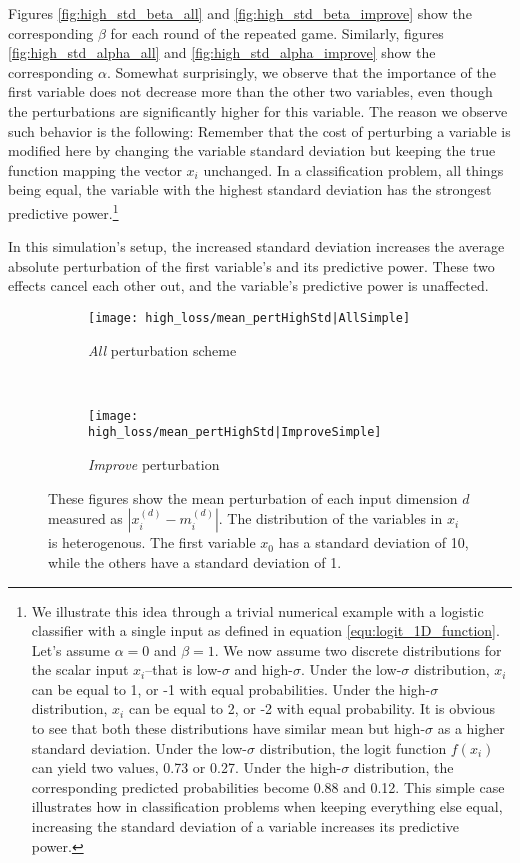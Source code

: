\documentclass[12pt]{article} %
\begin{document}
Figures \ref{fig:high_std_beta_all} and \ref{fig:high_std_beta_improve} show the corresponding $\beta$ for each round of the repeated game. Similarly, figures \ref{fig:high_std_alpha_all} and \ref{fig:high_std_alpha_improve} show the corresponding $\alpha$. Somewhat surprisingly, we observe that the importance of the first variable does not decrease more than the other two variables, even though the perturbations are significantly higher for this variable. The reason we observe such behavior is the following: Remember that the cost of perturbing a variable is modified here by changing the variable standard deviation but keeping the true function mapping the vector $x_i$ unchanged. In a classification problem, all things being equal, the variable with the highest standard deviation has the strongest predictive power.\footnote{
We illustrate this idea through a trivial numerical example with a logistic classifier with a single input as defined in equation \eqref{equ:logit_1D_function}. Let's assume $\alpha=0$ and $\beta=1$. We now assume two discrete distributions for the scalar input $x_i$--that is low-$\sigma$ and high-$\sigma$. Under the low-$\sigma$ distribution, $x_i$ can be equal to 1, or -1 with equal probabilities. Under the high-$\sigma$ distribution, $x_i$ can be equal to 2, or -2 with equal probability. It is obvious to see that both these distributions have similar mean but high-$\sigma$ as a higher standard deviation. Under the low-$\sigma$ distribution, the logit function $f(x_i)$ can yield two values,     0.73 or 0.27. Under the high-$\sigma$ distribution, the corresponding predicted probabilities become 0.88 and 0.12. This simple case illustrates how in classification problems when keeping everything else equal, increasing the standard deviation of a variable increases its predictive power.
}

In this simulation's setup, the increased standard deviation increases the average absolute perturbation of the first variable's and its predictive power. These two effects cancel each other out, and the variable's predictive power is unaffected.



\begin{figure*}[t!]
    \centering
    \begin{subfigure}{0.5\textwidth}
        \centering
        \texttt{[image: high\_loss/mean\_pertHighStd|AllSimple]}
        \caption{\textit{All} perturbation scheme}
        \label{fig:mean_pertAllSimpleHETERO}
    \end{subfigure}%
    ~ 
    \begin{subfigure}{0.5\textwidth}
        \centering
        \texttt{[image: high\_loss/mean\_pertHighStd|ImproveSimple]}
            \caption{\textit{Improve} perturbation}
        \label{fig:mean_pertImproveSimpleHETERO}
    \end{subfigure}
    \caption{These figures show the mean perturbation of each input dimension $d$ measured as $|x_i^{(d)}- m_i^{(d)}|$. The distribution of the variables in $x_i$ is heterogenous. The first variable $x_0$ has a standard deviation of 10, while the others have a standard deviation of 1.}
\end{figure*}
\end{document}
